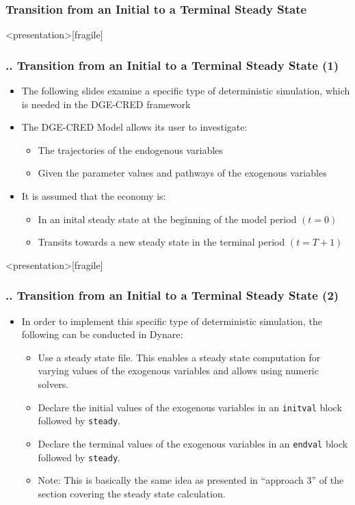 \documentclass[11pt,aspectratio=169]{beamer}
\begin{document}
\subsubsection{Transition from an Initial to a Terminal Steady State}
\begin{frame}<presentation>[fragile]
	\frametitle{{\thesection.\thesubsection.\thesubsubsection} Transition from an Initial to a Terminal Steady State (1)}
	\begin{itemize}
		\item The following slides examine a specific type of deterministic simulation, which is needed in the DGE-CRED framework 
		\item The DGE-CRED Model allows its user to investigate:
		\begin{itemize}
			\item The trajectories of the endogenous variables
			\item Given the parameter values and pathways of the exogenous variables
		\end{itemize} 
		\item It is assumed that the economy is:
		\begin{itemize}
			\item In an inital steady state at the beginning of the model period $(t=0)$
			\item Transits towards a new steady state in the terminal period $(t=T+1)$
		\end{itemize}
	\end{itemize}
\end{frame}
\begin{frame}<presentation>[fragile]
	\frametitle{{\thesection.\thesubsection.\thesubsubsection} Transition from an Initial to a Terminal Steady State (2)}
	\begin{itemize}
		\item In order to implement this specific type of deterministic simulation, the following can be conducted in Dynare:
		\begin{itemize}
			\item Use a steady state file. This enables a steady state computation for varying values of the exogenous variables and allows using numeric solvers.
			\item Declare the initial values of the exogenous variables in an \texttt{initval} block followed by \texttt{steady}.
			\item Declare the terminal values of the exogenous variables in an \texttt{endval} block followed by \texttt{steady}.
			\item Note: This is basically the same idea as presented in ``approach 3'' of the section covering the steady state calculation.
		\end{itemize}
	\end{itemize}
\end{frame}
\end{document}
